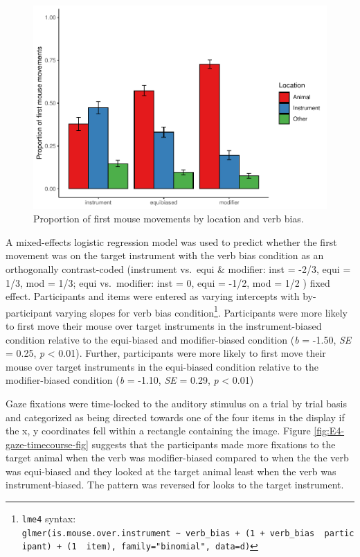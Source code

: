\documentclass[
  man,floatsintext]{apa6}
\begin{document}
\begin{figure}
\centering
\includegraphics{manuscript_files/figure-latex/E4-mouse-moves-fig-1.pdf}
\caption{\label{fig:E4-mouse-moves-fig}Proportion of first mouse movements by location and verb bias.}
\end{figure}

A mixed-effects logistic regression model was used to predict whether the first movement was on the target instrument with the verb bias condition as an orthogonally contrast-coded (instrument vs.~equi \& modifier: inst = -2/3, equi = 1/3, mod = 1/3; equi vs.~modifier: inst = 0, equi = -1/2, mod = 1/2 ) fixed effect. Participants and items were entered as varying intercepts with by-participant varying slopes for verb bias condition\footnote{\texttt{lme4} syntax: \texttt{glmer(is.mouse.over.instrument\ \textasciitilde{}\ verb\_bias\ +\ (1\ +\ verb\_bias\ \textbar{}\ participant)\ +\ (1\ \textbar{}\ item),\ family="binomial",\ data=d)}}. Participants were more likely to first move their mouse over target instruments in the instrument-biased condition relative to the equi-biased and modifier-biased condition (\emph{b} = -1.50, \emph{SE} = 0.25, \emph{p} \textless{} 0.01). Further, participants were more likely to first move their mouse over target instruments in the equi-biased condition relative to the modifier-biased condition (\emph{b} = -1.10, \emph{SE} = 0.29, \emph{p} \textless{} 0.01)

Gaze fixations were time-locked to the auditory stimulus on a trial by trial basis and categorized as being directed towards one of the four items in the display if the x, y coordinates fell within a rectangle containing the image. Figure \ref{fig:E4-gaze-timecourse-fig} suggests that the participants made more fixations to the target animal when the verb was modifier-biased compared to when the the verb was equi-biased and they looked at the target animal least when the verb was instrument-biased. The pattern was reversed for looks to the target instrument.
\end{document}
